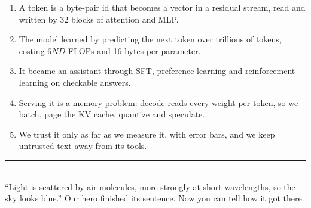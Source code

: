 \documentclass[10pt,a4paper]{extarticle}
\begin{document}
\vspace{3mm}
\begin{trap}
\begin{enumerate}[leftmargin=*,itemsep=1pt]
\item A token is a byte-pair id that becomes a vector in a residual stream, read and written by 32 blocks of attention and MLP.
\item The model learned by predicting the next token over trillions of tokens, costing $6ND$ FLOPs and 16 bytes per parameter.
\item It became an assistant through SFT, preference learning and reinforcement learning on checkable answers.
\item Serving it is a memory problem: decode reads every weight per token, so we batch, page the KV cache, quantize and speculate.
\item We trust it only as far as we measure it, with error bars, and we keep untrusted text away from its tools.
\end{enumerate}
\end{trap}

\begin{center}
{\color{rule}\rule{0.6\columnwidth}{0.4pt}}\\[2pt]
{\scriptsize\color{mute}``Light is scattered by air molecules, more strongly at short wavelengths, so the sky looks blue.'' Our hero finished its sentence. Now you can tell how it got there.}
\end{center}
\end{document}
